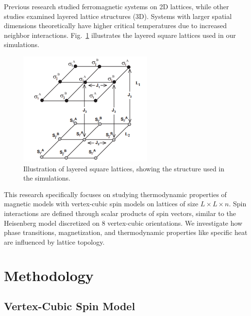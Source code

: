 \documentclass[conference, compsoc, twoside]{IEEEtran}
\begin{document}
Previous research \cite{Surungan2008} studied ferromagnetic systems on 2D lattices, while other studies \cite{Sutiono2013} examined layered lattice structures (3D). Systems with larger spatial dimensions theoretically have higher critical temperatures due to increased neighbor interactions. Fig.~\ref{fig:layered_lattice} illustrates the layered square lattices used in our simulations.

\begin{figure}[t]
    \centering
    \includegraphics[width=0.9\columnwidth]{Gambar 8. Ilustrasi Kisi Persegi Berlapis.png}
    \caption{Illustration of layered square lattices, showing the structure used in the simulations.}
    \label{fig:layered_lattice}
\end{figure}

This research specifically focuses on studying thermodynamic properties of magnetic models with vertex-cubic spin models on lattices of size $L \times L \times n$. Spin interactions are defined through scalar products of spin vectors, similar to the Heisenberg model discretized on 8 vertex-cubic orientations. We investigate how phase transitions, magnetization, and thermodynamic properties like specific heat are influenced by lattice topology.

\section{Methodology}

\subsection{Vertex-Cubic Spin Model}
\end{document}
